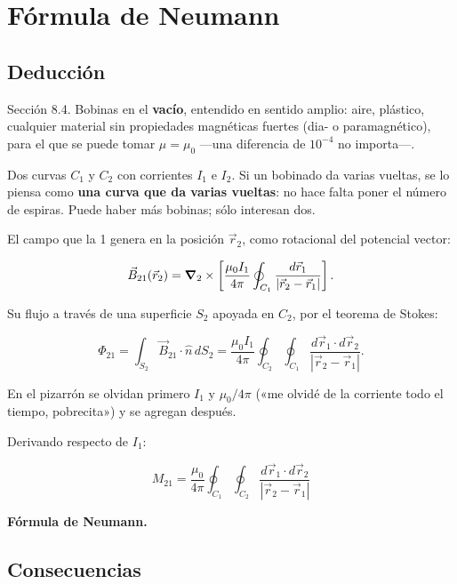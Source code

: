 \documentclass[12pt,a4paper]{article}
\begin{document}
\section{Fórmula de Neumann}

\subsection{Deducción}

Sección 8.4. Bobinas en el \textbf{vacío}, entendido en sentido amplio: aire,
plástico, cualquier material sin propiedades magnéticas fuertes (dia- o
paramagnético), para el que se puede tomar $\mu = \mu_0$ ---una diferencia de
$10^{-4}$ no importa---.

Dos curvas $C_1$ y $C_2$ con corrientes $I_1$ e $I_2$. Si un bobinado da varias
vueltas, se lo piensa como \textbf{una curva que da varias vueltas}: no hace falta
poner el número de espiras. Puede haber más bobinas; sólo interesan dos.

El campo que la 1 genera en la posición $\vec r_2$, como rotacional del
potencial vector:

\[
\vec B_{21}(\vec r_2) = \vnabla_2\times\left[\frac{\mu_0 I_1}{4\pi}\oint_{C_1}
\frac{d\vec r_1}{|\vec r_2-\vec r_1|}\right].
\]

Su flujo a través de una superficie $S_2$ apoyada en $C_2$, por el teorema de
Stokes:

\[
\Phi_{21} = \int_{S_2}\vec B_{21}\cdot\hat n\,dS_2
= \frac{\mu_0 I_1}{4\pi}\oint_{C_2}\oint_{C_1}
\frac{d\vec r_1\cdot d\vec r_2}{|\vec r_2-\vec r_1|}.
\]

\begin{notebox}
En el pizarrón se olvidan primero $I_1$ y $\mu_0/4\pi$ («me olvidé de la
corriente todo el tiempo, pobrecita») y se agregan después.
\end{notebox}

Derivando respecto de $I_1$:

\begin{keybox}
\[
\boxed{\ M_{21} = \frac{\mu_0}{4\pi}\oint_{C_1}\oint_{C_2}
\frac{d\vec r_1\cdot d\vec r_2}{|\vec r_2-\vec r_1|}\ }
\]
\end{keybox}

\textbf{Fórmula de Neumann.}

\subsection{Consecuencias}
\end{document}
